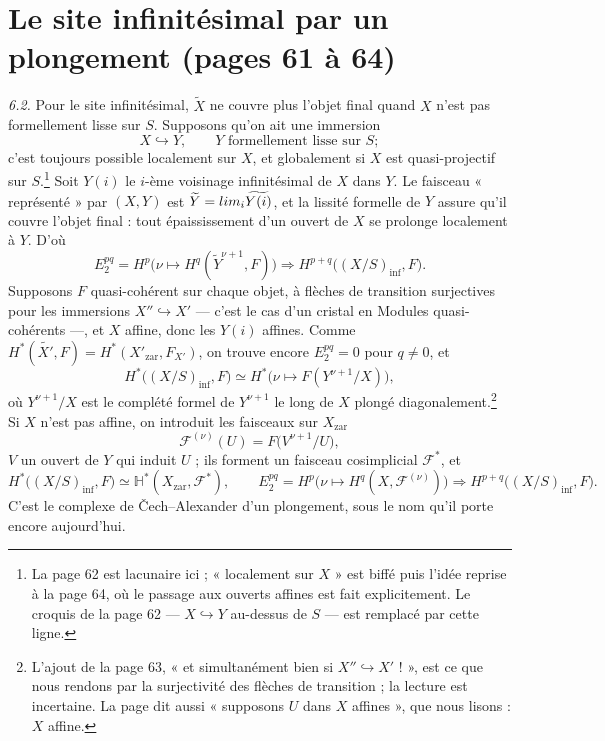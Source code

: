 \documentclass[11pt,a4paper]{article}
\begin{document}
\section*{Le site infinitésimal par un plongement (pages 61 à 64)}

\emph{6.2.} Pour le site infinitésimal, $\widetilde{X}$ ne couvre plus l'objet
final quand $X$ n'est pas formellement lisse sur $S$. Supposons qu'on ait une
immersion
\[
  X \hookrightarrow Y , \qquad Y \text{ formellement lisse sur } S ;
\]
c'est toujours possible localement sur $X$, et globalement si $X$ est
quasi-projectif sur $S$.\footnote{La page 62 est lacunaire ici ;
« localement sur $X$ » est biffé puis l'idée reprise à la page 64, où le
passage aux ouverts affines est fait explicitement. Le croquis de la page 62
— $X \hookrightarrow Y$ au-dessus de $S$ — est remplacé par cette ligne.}
Soit $Y(i)$ le $i$-ème voisinage infinitésimal de $X$ dans $Y$. Le faisceau
« représenté » par $(X, Y)$ est $\widetilde{Y} = \varinjlim_i
\widetilde{Y(i)}$, et la lissité formelle de $Y$ assure qu'il couvre l'objet
final : tout épaississement d'un ouvert de $X$ se prolonge localement à
$Y$. D'où
\[
  E_{2}^{pq} = H^{p}\bigl(\nu \mapsto H^{q}(\widetilde{Y}^{\nu+1}, F)\bigr)
  \Longrightarrow H^{p+q}\bigl((X/S)_{\mathrm{inf}}, F\bigr) .
\]
Supposons $F$ quasi-cohérent sur chaque objet, à flèches de transition
surjectives pour les immersions $X'' \hookrightarrow X'$ — c'est le cas d'un
cristal en Modules quasi-cohérents —, et $X$ affine, donc les $Y(i)$
affines. Comme $H^{*}(\widetilde{X'}, F) = H^{*}(X'_{\mathrm{zar}}, F_{X'})$,
on trouve encore $E_2^{pq} = 0$ pour $q \neq 0$, et
\[
  H^{*}\bigl((X/S)_{\mathrm{inf}}, F\bigr) \simeq
  H^{*}\bigl(\nu \mapsto F(Y^{\nu+1}/X)\bigr) ,
\]
où $Y^{\nu+1}/X$ est le complété formel de $Y^{\nu+1}$ le long de $X$
plongé diagonalement.\footnote{L'ajout de la page 63, « et simultanément
bien si $X'' \hookrightarrow X'$ ! », est ce que nous rendons par la
surjectivité des flèches de transition ; la lecture est incertaine. La page
dit aussi « supposons $U$ dans $X$ affines », que nous lisons : $X$ affine.}
Si $X$ n'est pas affine, on introduit les faisceaux sur $X_{\mathrm{zar}}$
\[
  \mathcal{F}^{(\nu)}(U) = F\bigl(V^{\nu+1}/U\bigr) ,
\]
$V$ un ouvert de $Y$ qui induit $U$ ; ils forment un faisceau cosimplicial
$\mathcal{F}^{*}$, et
\[
  H^{*}\bigl((X/S)_{\mathrm{inf}}, F\bigr) \simeq
  \mathbb{H}^{*}(X_{\mathrm{zar}}, \mathcal{F}^{*}) ,
  \qquad
  E_{2}^{pq} = H^{p}\bigl(\nu \mapsto H^{q}(X, \mathcal{F}^{(\nu)})\bigr)
  \Longrightarrow H^{p+q}\bigl((X/S)_{\mathrm{inf}}, F\bigr) .
\]
C'est le complexe de Čech--Alexander d'un plongement, sous le nom qu'il porte
encore aujourd'hui.
\end{document}
